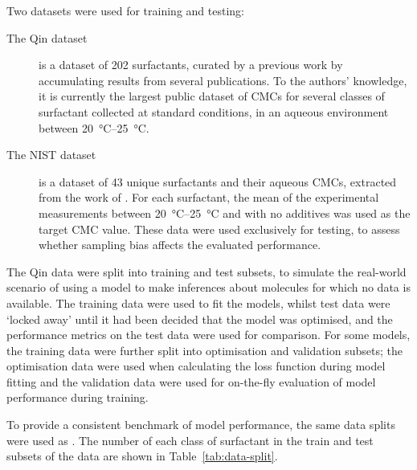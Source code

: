 \newcommand{\lrv}{\vec{v}^{\,(p)}}

Two datasets were used for training and testing:

\begin{description}
    \item[The Qin dataset] is a dataset of 202 surfactants, curated by a
          previous work \cite{qinPredictingCriticalMicelle2021} by accumulating
          results from several publications. To the authors' knowledge, it is
          currently the largest public dataset of CMCs for several classes of
          surfactant collected at standard conditions, in an aqueous environment
          between \SIrange{20}{25}{\celsius}.
    \item[The NIST dataset] is a dataset of 43 unique surfactants and their
          aqueous CMCs, extracted from the work of
          \citet{mukerjeeCriticalMicelleConcentrations1971}. For each
          surfactant, the mean of the experimental measurements between
          \SIrange{20}{25}{\degreeCelsius} and with no additives was used as the
          target CMC value. These data were used exclusively for testing, to
          assess whether sampling bias affects the evaluated performance.
\end{description}

The Qin data were split into training and test subsets, to simulate the real-world
scenario of using a model to make inferences about molecules for which no data
is available. The training data were used to fit the models, whilst test data
were `locked away' until it had been decided that the model was optimised, and
the performance metrics on the test data were used for comparison. For some
models, the training data were further split into optimisation and validation
subsets; the optimisation data were used when calculating the loss function
during model fitting and the validation data were used for on-the-fly evaluation
of model performance during training.

To provide a consistent benchmark of model performance, the same data splits
were used as \citet{qinPredictingCriticalMicelle2021}. The number of each class
of surfactant in the train and test subsets of the data are shown in
Table~\ref{tab:data-split}.


